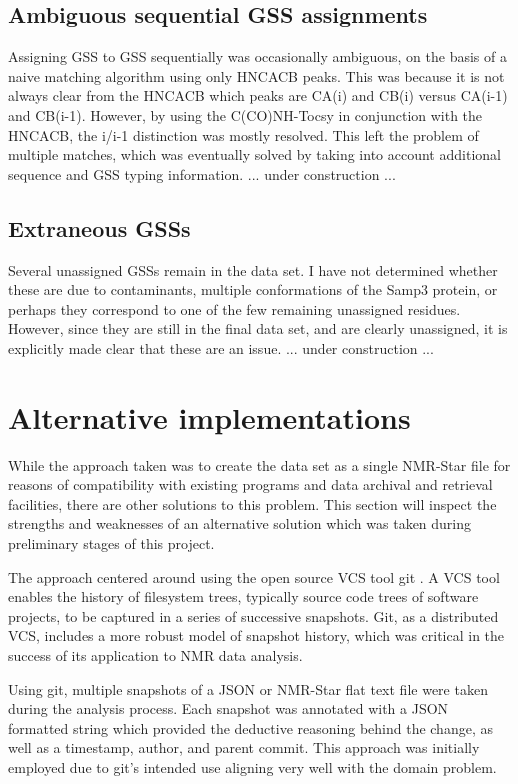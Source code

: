 \subsection{Ambiguous sequential GSS assignments}
Assigning GSS to GSS sequentially was occasionally ambiguous, on the basis of
a naive matching algorithm using only HNCACB peaks.  This was because it is
not always clear from the HNCACB which peaks are CA(i) and CB(i) versus CA(i-1)
and CB(i-1).  However, by using the C(CO)NH-Tocsy in conjunction with the
HNCACB, the i/i-1 distinction was mostly resolved.  This left the problem of
multiple matches, which was eventually solved by taking into account additional
sequence and GSS typing information.
... under construction ...

\subsection{Extraneous GSSs}
Several unassigned GSSs remain in the data set.  I have not determined whether
these are due to contaminants, multiple conformations of the Samp3 protein,
or perhaps they correspond to one of the few remaining unassigned residues.
However, since they are still in the final data set, and are clearly unassigned,
it is explicitly made clear that these are an issue.
... under construction ...


\section{Alternative implementations}

While the approach taken was to create the data set as a single NMR-Star
file for reasons of compatibility with existing programs and data archival
and retrieval facilities, there are other solutions to this problem.  This
section will inspect the strengths and weaknesses of an alternative solution
which was taken during preliminary stages of this project.

The approach centered around using the open source VCS tool git 
\cite{loeliger2012git}.  A VCS tool enables the history of filesystem trees,
typically source code trees of software projects, to be captured in a series
of successive snapshots.  Git, as a distributed VCS, includes a more robust
model of snapshot history, which was critical in the success of its 
application to NMR data analysis.

Using git, multiple snapshots of a JSON or NMR-Star flat text file were
taken during the analysis process.  Each snapshot was annotated with a 
JSON formatted string which provided the deductive reasoning behind the change,
as well as a timestamp, author, and parent commit.  This approach was initially
employed due to git's intended use aligning very well with the domain problem.

